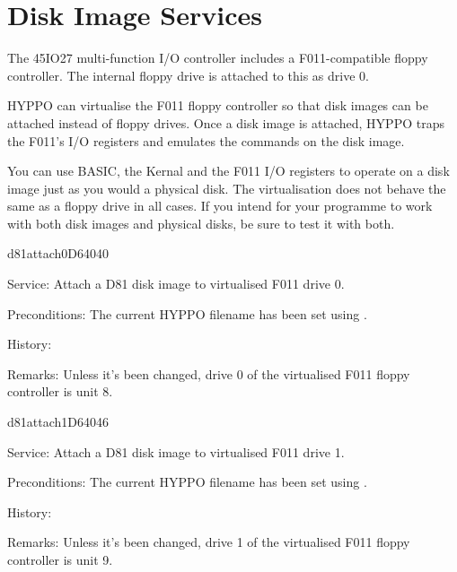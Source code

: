 \newpage
\section{Disk Image Services}

The 45IO27 multi-function I/O controller includes a F011-compatible floppy
controller. The internal floppy drive is attached to this as drive 0.

HYPPO can virtualise the F011 floppy controller so that disk images
can be attached instead of floppy drives. Once a disk image is attached,
HYPPO traps the F011's I/O registers and emulates the commands on the disk
image.

You can use BASIC, the Kernal and the F011 I/O registers to operate on a disk
image just as you would a physical disk. The virtualisation does not behave the
same as a floppy drive in all cases. If you intend for your programme to work
with both disk images and physical disks, be sure to test it with both.


\begin{hyppotrap}{d81attach0}{D640}{40}
\item [Service:]
  Attach a D81 disk image to virtualised F011 drive 0.
\item [Preconditions:]
  The current HYPPO filename has been set using .
\item [History:]
\item [Remarks:]
  Unless it's been changed, drive 0 of the virtualised F011 floppy controller is
  unit 8.
\end{hyppotrap}


\newpage
\begin{hyppotrap}{d81attach1}{D640}{46}
\item [Service:]
  Attach a D81 disk image to virtualised F011 drive 1.
\item [Preconditions:]
  The current HYPPO filename has been set using .
\item [History:]
\item [Remarks:]
  Unless it's been changed, drive 1 of the virtualised F011 floppy controller is
  unit 9.
\end{hyppotrap}


